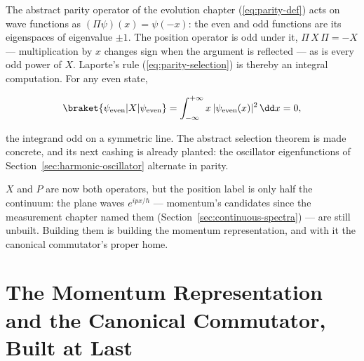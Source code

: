 The abstract parity operator of the evolution chapter (\eqref{eq:parity-def}) acts on wave functions as $(\Pi\psi)(x) = \psi(-x)$: the even and odd functions are its eigenspaces of eigenvalue $\pm 1$. The position operator is odd under it, $\Pi\,X\,\Pi = -X$ --- multiplication by $x$ changes sign when the argument is reflected --- as is every odd power of $X$. Laporte's rule (\eqref{eq:parity-selection}) is thereby an integral computation. For any even state,
\begin{linenomath}
    \begin{equation*}
        \braket{\psi_{\mathrm{even}}|X|\psi_{\mathrm{even}}} = \int_{-\infty}^{+\infty} x\,|\psi_{\mathrm{even}}(x)|^2\,\dd x = 0,
    \end{equation*}
\end{linenomath}
the integrand odd on a symmetric line. The abstract selection theorem is made concrete, and its next cashing is already planted: the oscillator eigenfunctions of Section~\ref{sec:harmonic-oscillator} alternate in parity.

$X$ and $P$ are now both operators, but the position label is only half the continuum: the plane waves $e^{ipx/\hbar}$ --- momentum's candidates since the measurement chapter named them (Section~\ref{sec:continuous-spectra}) --- are still unbuilt. Building them is building the momentum representation, and with it the canonical commutator's proper home.

\section{The Momentum Representation and the Canonical Commutator, Built at Last}
\label{sec:momentum-representation}

